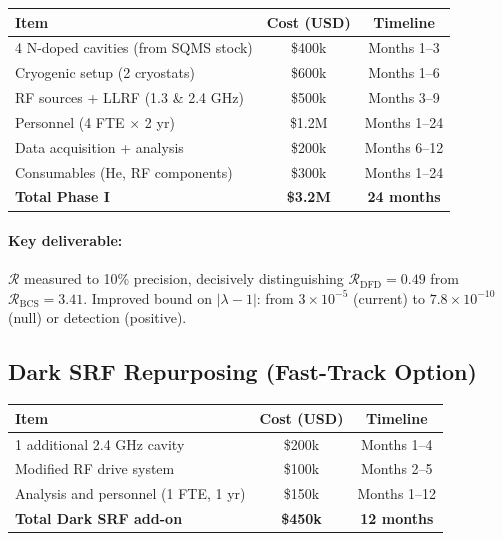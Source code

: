 \documentclass[11pt]{article}
\newcommand{\ee}[1]{\times 10^{#1}}
\newcommand{\lbone}{|\lambda - 1|}
\begin{document}
\begin{center}
\begin{tabular}{lcc}
\toprule
\textbf{Item} & \textbf{Cost (USD)} & \textbf{Timeline} \\
\midrule
4 N-doped cavities (from SQMS stock) & \$400k & Months 1--3 \\
Cryogenic setup (2 cryostats) & \$600k & Months 1--6 \\
RF sources + LLRF (1.3 \& 2.4 GHz) & \$500k & Months 3--9 \\
Personnel (4 FTE $\times$ 2 yr) & \$1.2M & Months 1--24 \\
Data acquisition + analysis & \$200k & Months 6--12 \\
Consumables (He, RF components) & \$300k & Months 1--24 \\
\midrule
\textbf{Total Phase I} & \textbf{\$3.2M} & \textbf{24 months} \\
\bottomrule
\end{tabular}
\end{center}

\paragraph{Key deliverable:}
$\mathcal{R}$ measured to 10\% precision, decisively distinguishing
$\mathcal{R}_{\text{DFD}} = 0.49$ from $\mathcal{R}_{\text{BCS}} = 3.41$.
Improved bound on $\lbone$: from $3\ee{-5}$ (current) to
$7.8\ee{-10}$ (null) or detection (positive).

\subsection{Dark SRF Repurposing (Fast-Track Option)}

\begin{center}
\begin{tabular}{lcc}
\toprule
\textbf{Item} & \textbf{Cost (USD)} & \textbf{Timeline} \\
\midrule
1 additional 2.4 GHz cavity & \$200k & Months 1--4 \\
Modified RF drive system & \$100k & Months 2--5 \\
Analysis and personnel (1 FTE, 1 yr) & \$150k & Months 1--12 \\
\midrule
\textbf{Total Dark SRF add-on} & \textbf{\$450k} & \textbf{12 months} \\
\bottomrule
\end{tabular}
\end{center}
\end{document}
